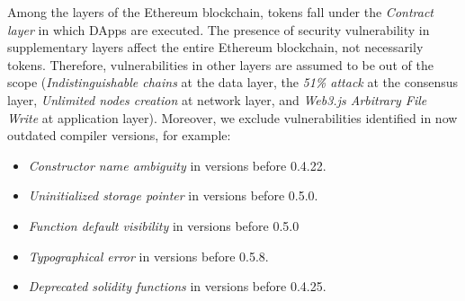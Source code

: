 Among the layers of the Ethereum blockchain, \erc tokens fall under the \textit{Contract layer} in which DApps are executed. The presence of security vulnerability in supplementary layers affect the entire Ethereum blockchain, not necessarily \erc tokens. Therefore, vulnerabilities in other layers are assumed to be out of the scope (\eg \textit{Indistinguishable chains} at the data layer, the \textit{51\% attack} at the consensus layer, \textit{Unlimited nodes creation} at network layer, and \textit{Web3.js Arbitrary File Write} at application layer). Moreover, we exclude vulnerabilities identified in now outdated compiler versions, for example:
\begin{itemize}[noitemsep,topsep=0pt]
	\item \textit{Constructor name ambiguity} in versions before 0.4.22.
	\item \textit{Uninitialized storage pointer} in versions before 0.5.0.
	\item \textit{Function default visibility} in versions before 0.5.0
	\item \textit{Typographical error} in versions before 0.5.8.
	\item \textit{Deprecated solidity functions} in versions before 0.4.25.
\end{itemize}

